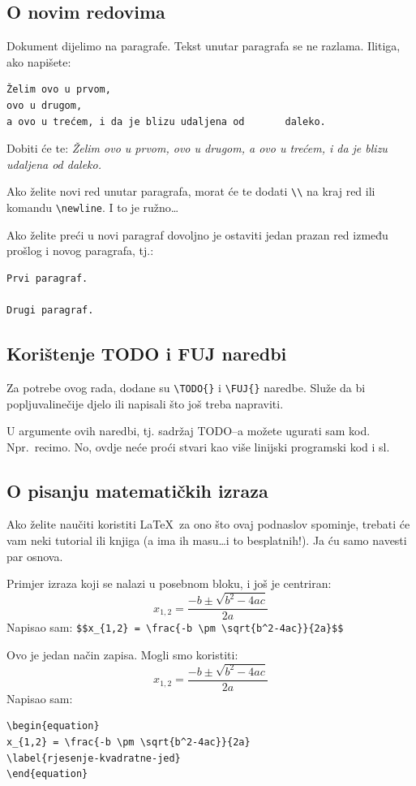 \documentclass{article}
\begin{document}
\subsection{O novim redovima}
Dokument dijelimo na paragrafe. Tekst unutar paragrafa se ne razlama. Ilitiga,
ako napišete:
\begin{verbatim}
Želim ovo u prvom,
ovo u drugom,
a ovo u trećem, i da je blizu udaljena od       daleko.
\end{verbatim}
Dobiti će te:
\emph{Želim ovo u prvom,
ovo u drugom,
a ovo u trećem, i da je blizu udaljena od       daleko.}

Ako želite novi red unutar paragrafa, morat će te dodati
\verb|\\| na kraj red ili komandu \verb|\newline|. I to je ružno\ldots

Ako želite preći u novi paragraf dovoljno je ostaviti jedan prazan red između
prošlog i novog paragrafa, tj.:
\begin{verbatim}
Prvi paragraf.

Drugi paragraf.
\end{verbatim}

\subsection{Korištenje TODO i FUJ naredbi}
Za potrebe ovog rada, dodane su \verb|\TODO{}| i \verb|\FUJ{}| naredbe. Služe
da bi popljuvalinečije djelo ili napisali što još treba
napraviti.

U argumente ovih naredbi, tj. sadržaj \textsf{TODO}--a možete ugurati sam kod.
Npr.~recimo. No, ovdje neće proći stvari kao više
linijski programski kod i sl.

\subsection{O pisanju matematičkih izraza}
Ako želite naučiti koristiti \LaTeX~za ono što ovaj podnaslov spominje, trebati
će vam neki tutorial ili knjiga (a ima ih masu\ldots i to besplatnih!).
Ja ću samo navesti par osnova.

Primjer izraza koji se nalazi u posebnom bloku, i još je centriran:
$$x_{1,2} = \frac{-b \pm \sqrt{b^2-4ac}}{2a}$$
Napisao sam: \verb|$$x_{1,2} = \frac{-b \pm \sqrt{b^2-4ac}}{2a}$$|

Ovo je jedan način zapisa. Mogli smo koristiti:
\begin{equation}
x_{1,2} = \frac{-b \pm \sqrt{b^2-4ac}}{2a}
\label{rjesenje-kvadratne-jed}
\end{equation}
Napisao sam:
\begin{verbatim}
\begin{equation}
x_{1,2} = \frac{-b \pm \sqrt{b^2-4ac}}{2a}
\label{rjesenje-kvadratne-jed}
\end{equation}
\end{verbatim}
\end{document}
